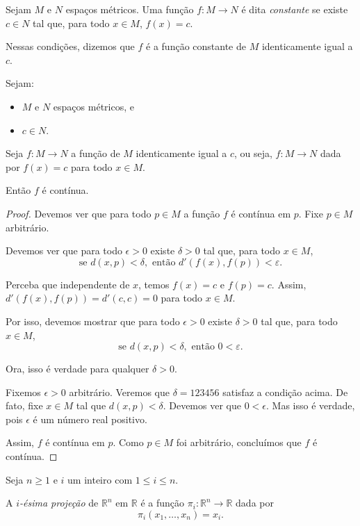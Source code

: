 \begin{definition}
    Sejam $M$ e $N$ espaços métricos.
    Uma função $f: M\rightarrow N$ é dita \emph{constante} se existe $c\in N$ tal que, para todo $x\in M$, $f(x) = c$.

    Nessas condições, dizemos que $f$ é a função constante de $M$ identicamente igual a $c$.
\end{definition}
\begin{proposition}
    Sejam:
    \begin{itemize}
        \item $M$ e $N$ espaços métricos, e
        \item $c \in N$.
    \end{itemize}

    Seja $f: M\rightarrow N$ a função de $M$ identicamente igual a $c$, ou seja, $f: M\rightarrow N$ dada por $f(x) = c$ para todo $x\in M$.

    Então $f$ é contínua.
\end{proposition}


\begin{proof}
    Devemos ver que para todo $p\in M$ a função $f$ é contínua em $p$.
    Fixe $p\in M$ arbitrário.

    Devemos ver que para todo $\epsilon>0$ existe $\delta>0$ tal que, para todo $x\in M$,
    \[
        \text{se } d(x, p) < \delta, \text{ então } d'(f(x), f(p)) < \varepsilon.
    \]

    Perceba que independente de $x$, temos $f(x) = c$ e $f(p) = c$.
    Assim, $d'(f(x), f(p)) = d'(c, c) = 0$ para todo $x\in M$.

    Por isso, devemos mostrar que para todo $\epsilon>0$ existe $\delta>0$ tal que, para todo $x\in M$,
    \[
        \text{se } d(x, p) < \delta, \text{ então } 0 < \varepsilon.
    \]

    Ora, isso é verdade para qualquer $\delta>0$.

    Fixemos $\epsilon>0$ arbitrário.
    Veremos que $\delta = 123456$ satisfaz a condição acima.
    De fato, fixe $x \in M$ tal que $d(x, p) < \delta$.
    Devemos ver que $0 < \epsilon$.
    Mas isso é verdade, pois $\epsilon$ é um número real positivo.

    Assim, $f$ é contínua em $p$.
    Como $p\in M$ foi arbitrário, concluímos que $f$ é contínua.
\end{proof}


\begin{definition}
    Seja $n\geq 1$ e $i$ um inteiro com $1\leq i\leq n$.
    
    A \emph{$i$-ésima projeção} de $\mathbb R^n$ em $\mathbb R$ é a função $\pi_i: \mathbb R^n\rightarrow \mathbb R$ dada por
    \[
        \pi_i(x_1, \dots, x_n) = x_i.
    \]
\end{definition}

